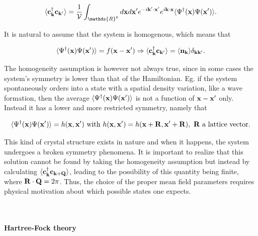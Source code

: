 \begin{equation}
    \langle {\bf c}_{{\bf k}}^\dagger {\bf c}_{{\bf k}'} \rangle = \frac{1}{\mathcal{V}} \int_{\mathds{R}^6} d{\bf x} d{\bf x}' e^{-i {\bf k}' \cdot {\bf x}'} e^{i {\bf k} \cdot {\bf x}} \langle \Psi^\dagger({\bf x}) \Psi({\bf x}') \rangle.
\end{equation}

It is natural to assume that the system is homogenous, which means that 

\begin{equation}
    \langle \Psi^\dagger({\bf x}) \Psi({\bf x}') \rangle = f({\bf x} - {\bf x}') \Rightarrow \langle {\bf c}_{{\bf k}}^\dagger {\bf c}_{{\bf k}'} \rangle = \langle {\bf n}_{\bf k} \rangle \delta_{{\bf k}{\bf k}'}.
\end{equation}

The homogeneity assumption is however not always true, since in some cases the system's symmetry is lower than that of the Hamiltonian. Eg. if the system spontaneously orders into a state with a spatial density variation, like a wave formation, then the average $\langle \Psi^\dagger({\bf x}) \Psi({\bf x}') \rangle$ is not a function of ${\bf x} - {\bf x}'$ only. Instead it has a lower and more restricted symmetry, namely that 

$$
    \langle \Psi^\dagger({\bf x}) \Psi({\bf x}') \rangle = h({\bf x}, {\bf x}') \textnormal{ with } h({\bf x}, {\bf x}') = h({\bf x} + {\bf R}, {\bf x}' + {\bf R}), \textnormal{ ${\bf R}$ a lattice vector}.
$$

\begin{tcolorbox}[colback = yellow, title = Physical Context]

This kind of crystal structure exists in nature and when it happens, the system undergoes a broken symmetry phenomena. It is important to realize that this solution cannot be found by taking the homogeneity assumption but instead by calculating $ \langle {\bf c}_{{\bf k}}^\dagger {\bf c}_{{\bf k} + {\bf Q}} \rangle$, leading to the possibility of this quantity being finite, where ${\bf R} \cdot {\bf Q} = 2\pi$. Thus, the choice of the proper mean field parameters requires physical motivation about which possible states one expects. 

\end{tcolorbox}

\blanky \\

\paragraph{\textbf{Hartree-Fock theory}}

